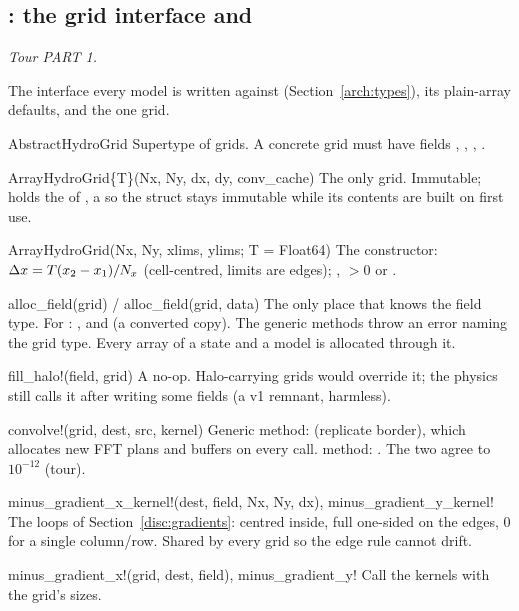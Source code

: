 \subsection{: the grid interface and }\label{ref:grid}
\emph{Tour PART 1.}

The interface every model is written against (Section~\ref{arch:types}), its plain-array defaults, and the one grid.
\begin{fnlist}
\item[AbstractHydroGrid] Supertype of grids. A concrete grid must have fields , , , .
\item[ArrayHydroGrid\{T\}(Nx, Ny, dx, dy, conv\_cache)] The only grid. Immutable; 
  holds the  of , a  so the struct stays immutable while its contents are built on
  first use.
\item[ArrayHydroGrid(Nx, Ny, xlims, ylims; T = Float64)] The constructor: $\Delta x = T(x_2-x_1)/N_x$ (cell-centred, limits are
  edges); ,  $>0$ or .
\item[alloc\_field(grid) / alloc\_field(grid, data)] The only place that knows the field type. For :
  , and  (a converted copy). The generic methods throw an error naming the
  grid type. Every array of a state and a model is allocated through it.
\item[fill\_halo!(field, grid)] A no-op. Halo-carrying grids would override it; the physics still calls it after writing
  some fields (a v1 remnant, harmless).
\item[convolve!(grid, dest, src, kernel)] Generic method:  (replicate border),
  which allocates new FFT plans and buffers on every call.  method:
  . The two agree to $10^{-12}$ (tour).
\item[minus\_gradient\_x\_kernel!(dest, field, Nx, Ny, dx), minus\_gradient\_y\_kernel!] The loops of
  Section~\ref{disc:gradients}: centred inside, full one-sided on the edges, 0 for a single column/row. Shared by every
  grid so the edge rule cannot drift.
\item[minus\_gradient\_x!(grid, dest, field), minus\_gradient\_y!] Call the kernels with the grid's sizes.

\end{fnlist}
